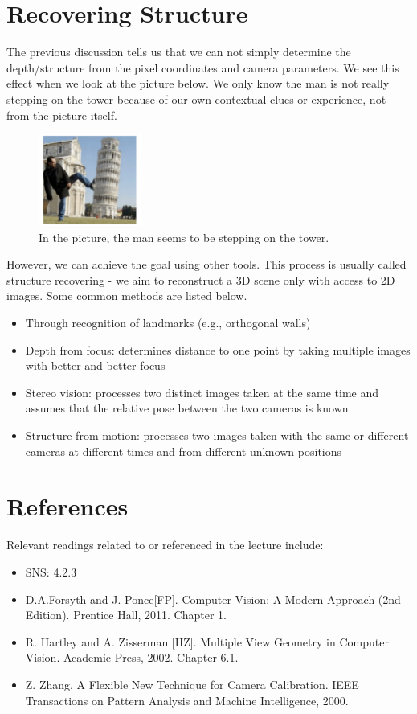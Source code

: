 \documentclass[]{article}
\begin{document}
\section{Recovering Structure}
The previous discussion tells us that we can not simply determine the depth/structure from the pixel coordinates and camera parameters. We see this effect when we look at the picture below. We only know the man is not really stepping on the tower because of our own contextual clues or experience, not from the picture itself.

\begin{figure}[H]
\includegraphics[width=0.3\textwidth]{stepping_on_tower.png}
\centering
\caption{In the picture, the man seems to be stepping on the tower.}
\label{fig:stepping_on_tower}
\end{figure}

However, we can achieve the goal using other tools. This process is usually called structure recovering - we aim to reconstruct a 3D scene only with access to 2D images. Some common methods are listed below.

\begin{itemize}
  \item Through	recognition of landmarks (e.g., orthogonal walls)
  \item Depth from focus: determines distance to one point by taking multiple images with better and better focus
  \item Stereo vision: processes two distinct images taken at the same time and assumes that the relative pose between the two cameras is known
  \item Structure from motion: processes two images taken with the same or different cameras at different times and from different unknown positions
\end{itemize}

\section{References}
Relevant readings related to or referenced in the lecture include:
\begin{itemize}
  \item SNS: 4.2.3
  \item D.A.Forsyth	and	J.	Ponce[FP]. Computer Vision:	A	Modern	Approach	(2nd	
Edition).	Prentice	Hall,	2011.	Chapter	1.
  \item R.	Hartley	and	A.	Zisserman	[HZ].	Multiple	View	Geometry	in	Computer	
Vision.	Academic	Press,	2002.	Chapter	6.1.
  \item Z.	Zhang.	A	Flexible	New	Technique	for	Camera	Calibration. IEEE	Transactions	
on	Pattern	Analysis	and	Machine	Intelligence,	2000.
\end{itemize}
\end{document}
